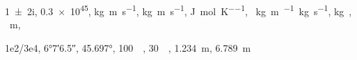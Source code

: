 \documentclass[varwidth]{standalone}
\begin{document}
\num{1+-2i}, \num{.3e45}, \si{kg.m.s^{-1}}, 
\si{\kilogram\metre\per\second}, \si{\joule\per\mole\per\kelvin}, 
\si[per-mode=fraction]{\cancel\kilogram\metre\per\cancel\kilogram\per\second},
\si{\kilogram\tothefourth}, \si{\quartic\metre}, \par \num{1e2/3e4},
\ang{6;7;6.5}, \ang[angle-symbol-over-decimal]{45.697}, 
\SI{100}{\mebi\byte}, \SI[prefixes-as-symbols=false]{30}{\kibi\bit}, 
\SI{1.234}{\metre}, \SI[locale = DE]{6.789}{\metre}
\end{document}
